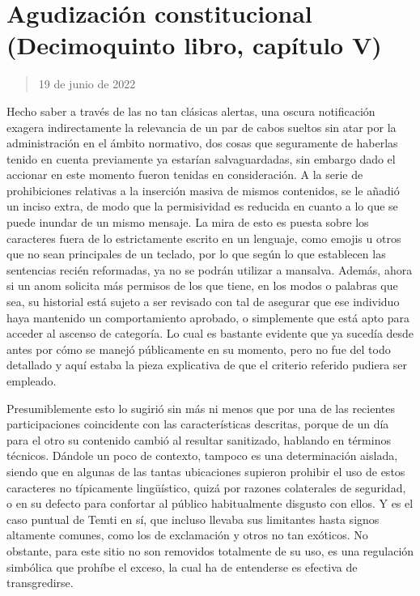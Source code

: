 \documentclass[
]{book}
\begin{document}
\hypertarget{agudizaciuxf3n-constitucional-decimoquinto-libro-capuxedtulo-v}{%
\section{Agudización constitucional (Decimoquinto libro, capítulo V)}\label{agudizaciuxf3n-constitucional-decimoquinto-libro-capuxedtulo-v}}

\begin{quote}
19 de junio de 2022
\end{quote}

Hecho saber a través de las no tan clásicas alertas, una oscura notificación exagera indirectamente la relevancia de un par de cabos sueltos sin atar por la administración en el ámbito normativo, dos cosas que seguramente de haberlas tenido en cuenta previamente ya estarían salvaguardadas, sin embargo dado el accionar en este momento fueron tenidas en consideración. A la serie de prohibiciones relativas a la inserción masiva de mismos contenidos, se le añadió un inciso extra, de modo que la permisividad es reducida en cuanto a lo que se puede inundar de un mismo mensaje. La mira de esto es puesta sobre los caracteres fuera de lo estrictamente escrito en un lenguaje, como emojis u otros que no sean principales de un teclado, por lo que según lo que establecen las sentencias recién reformadas, ya no se podrán utilizar a mansalva. Además, ahora si un anom solicita más permisos de los que tiene, en los modos o palabras que sea, su historial está sujeto a ser revisado con tal de asegurar que ese individuo haya mantenido un comportamiento aprobado, o simplemente que está apto para acceder al ascenso de categoría. Lo cual es bastante evidente que ya sucedía desde antes por cómo se manejó públicamente en su momento, pero no fue del todo detallado y aquí estaba la pieza explicativa de que el criterio referido pudiera ser empleado.

Presumiblemente esto lo sugirió sin más ni menos que por una de las recientes participaciones coincidente con las características descritas, porque de un día para el otro su contenido cambió al resultar sanitizado, hablando en términos técnicos. Dándole un poco de contexto, tampoco es una determinación aislada, siendo que en algunas de las tantas ubicaciones supieron prohibir el uso de estos caracteres no típicamente lingüístico, quizá por razones colaterales de seguridad, o en su defecto para confortar al público habitualmente disgusto con ellos. Y es el caso puntual de Temti en sí, que incluso llevaba sus limitantes hasta signos altamente comunes, como los de exclamación y otros no tan exóticos. No obstante, para este sitio no son removidos totalmente de su uso, es una regulación simbólica que prohíbe el exceso, la cual ha de entenderse es efectiva de transgredirse.
\end{document}

